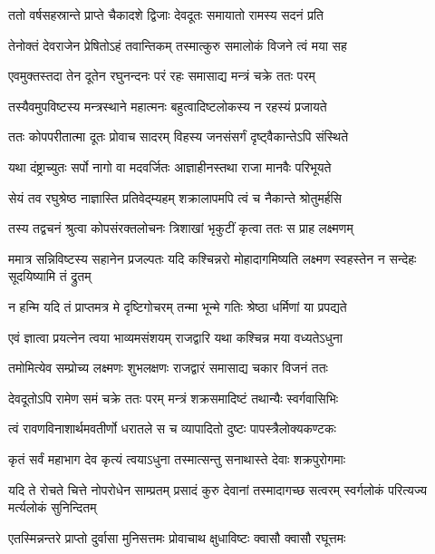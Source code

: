 \twolineshloka
{ततो वर्षसहस्रान्ते प्राप्ते चैकादशे द्विजाः}
{देवदूतः समायातो रामस्य सदनं प्रति}%

\twolineshloka
{तेनोक्तं देवराजेन प्रेषितोऽहं तवान्तिकम्}
{तस्मात्कुरु समालोकं विजने त्वं मया सह}%

\twolineshloka
{एवमुक्तस्तदा तेन दूतेन रघुनन्दनः}
{परं रहः समासाद्य मन्त्रं चक्रे ततः परम्}%

\twolineshloka
{तस्यैवमुपविष्टस्य मन्त्रस्थाने महात्मनः}
{बहुत्वादिष्टलोकस्य न रहस्यं प्रजायते}%

\twolineshloka
{ततः कोपपरीतात्मा दूतः प्रोवाच सादरम्}
{विहस्य जनसंसर्गं दृष्ट्वैकान्तेऽपि संस्थिते}%

\twolineshloka
{यथा दंष्ट्राच्युतः सर्पो नागो वा मदवर्जितः}
{आज्ञाहीनस्तथा राजा मानवैः परिभूयते}%

\twolineshloka
{सेयं तव रघुश्रेष्ठ नाज्ञास्ति प्रतिवेद्म्यहम्}
{शक्रालापमपि त्वं च नैकान्ते श्रोतुमर्हसि}%

\twolineshloka
{तस्य तद्वचनं श्रुत्वा कोपसंरक्तलोचनः}
{त्रिशाखां भृकुटीं कृत्वा ततः स प्राह लक्ष्मणम्}%

\threelineshloka
{ममात्र सन्निविष्टस्य सहानेन प्रजल्पतः}
{यदि कश्चिन्नरो मोहादागमिष्यति लक्ष्मण}
{स्वहस्तेन न सन्देहः सूदयिष्यामि तं द्रुतम्}%

\twolineshloka
{न हन्मि यदि तं प्राप्तमत्र मे दृष्टिगोचरम्}
{तन्मा भून्मे गतिः श्रेष्ठा धर्मिणां या प्रपद्यते}%

\twolineshloka
{एवं ज्ञात्वा प्रयत्नेन त्वया भाव्यमसंशयम्}
{राजद्वारि यथा कश्चिन्न मया वध्यतेऽधुना}%

\twolineshloka
{तमोमित्येव सम्प्रोच्य लक्ष्मणः शुभलक्षणः}
{राजद्वारं समासाद्य चकार विजनं ततः}%

\twolineshloka
{देवदूतोऽपि रामेण समं चक्रे ततः परम्}
{मन्त्रं शक्रसमादिष्टं तथान्यैः स्वर्गवासिभिः}%


\twolineshloka
{त्वं रावणविनाशार्थमवतीर्णो धरातले}
{स च व्यापादितो दुष्टः पापस्त्रैलोक्यकण्टकः}%

\twolineshloka
{कृतं सर्वं महाभाग देव कृत्यं त्वयाऽधुना}
{तस्मात्सन्तु सनाथास्ते देवाः शक्रपुरोगमाः}%

\threelineshloka
{यदि ते रोचते चित्ते नोपरोधेन साम्प्रतम्}
{प्रसादं कुरु देवानां तस्मादागच्छ सत्वरम्}
{स्वर्गलोकं परित्यज्य मर्त्यलोकं सुनिन्दितम्}%


\twolineshloka
{एतस्मिन्नन्तरे प्राप्तो दुर्वासा मुनिसत्तमः}
{प्रोवाचाथ क्षुधाविष्टः क्वासौ क्वासौ रघूत्तमः}%

